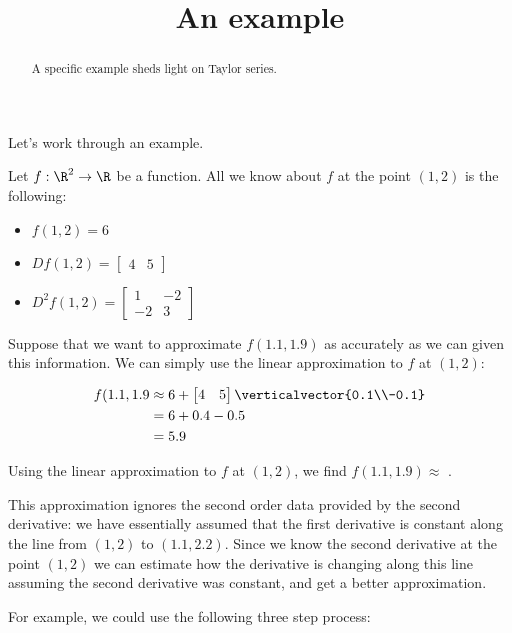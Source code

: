 \documentclass{ximera}
\title{An example}
\begin{document}
\begin{abstract}
  A specific example sheds light on Taylor series.
\end{abstract}

Let's work through an example.

\begin{question}
  Let $f:\R^2 \to \R$ be a function.  All we know about $f$ at the point $(1,2)$ is the following:
  \begin{itemize}
  \item $f(1,2) = 6$
  \item \(Df(1,2) = \begin{bmatrix} 4 & 5 \end{bmatrix}\)
  \item \( D^2f(1,2)  = \begin{bmatrix} 1 & -2 \\ -2 & 3\end{bmatrix}\)
  \end{itemize} 
  
  Suppose that we want to approximate $f(1.1,1.9)$ as accurately as we can given this information.
  We can simply use the linear approximation to $f$ at $(1,2)$:
  
  \begin{solution}
    \begin{hint}
      \begin{align*}
        f(1.1,1.9 &\approx 6+\begin{bmatrix} 4 & 5 \end{bmatrix} \verticalvector{0.1\\-0.1}\\
        &=6+0.4-0.5\\
        &=5.9
      \end{align*}
    \end{hint}
    Using the linear approximation to $f$ at $(1,2)$, we find $f(1.1,1.9) \approx$ .
  \end{solution}
  
  This approximation ignores the second order data provided by the second derivative: we have essentially 
  assumed that the first derivative is constant along the line from $(1,2)$ to $(1.1,2.2)$.  Since we know the second 
  derivative at the point $(1,2)$ we can estimate how the derivative is changing along this line assuming the second 
  derivative was constant, and get a better approximation.
  
  For example, we could use the following three step process:
  

\end{question}
\end{document}

